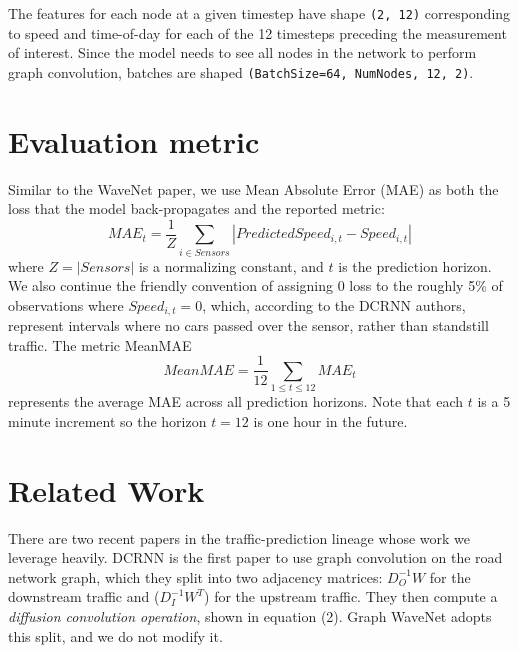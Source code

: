 \documentclass[10pt]{article}
\begin{document}
The features for each node at a given timestep have shape \texttt{(2, 12)} corresponding to speed and time-of-day for each of the 12 timesteps preceding the measurement of interest. Since the model needs to see all nodes in the network to perform graph convolution, batches are shaped \texttt{(BatchSize=64, NumNodes, 12, 2)}.


\section{Evaluation metric}
Similar to the WaveNet \citep{WaveNet} paper, we use Mean Absolute Error (MAE) as both the loss that the model back-propagates and the reported metric:
$$MAE_{t} = \frac{1}{Z} \sum_{i \in Sensors} |PredictedSpeed_{i,t} -
Speed_{i, t}|$$
where $Z = |Sensors|$ is a normalizing constant, and $t$ is the prediction horizon. We also continue the friendly convention of assigning 0 loss to the roughly 5\% of observations where $Speed_{i, t}=0$, which, according to the DCRNN authors, represent intervals where no cars passed over the sensor, rather than standstill traffic. The metric MeanMAE
$$MeanMAE = \frac{1}{12} \sum_{1 \leq t \leq 12}  MAE_{t}$$ represents the average MAE across all prediction horizons. Note that each $t$ is a 5 minute increment so the horizon $t=12$ is one hour in the future.

\section{Related Work}
There are two recent papers in the traffic-prediction lineage whose work we leverage heavily. DCRNN \citep{li2018dcrnn_traffic} is the first paper to use graph convolution on the road network graph, which they split into two adjacency matrices: $D^{-1}_OW$ for the downstream traffic and  ($D^{-1}_IW^T$) for the upstream traffic. 
They then compute a \textit{diffusion convolution operation}, shown in equation (2).  Graph WaveNet adopts this split, and we do not modify it.
\end{document}
